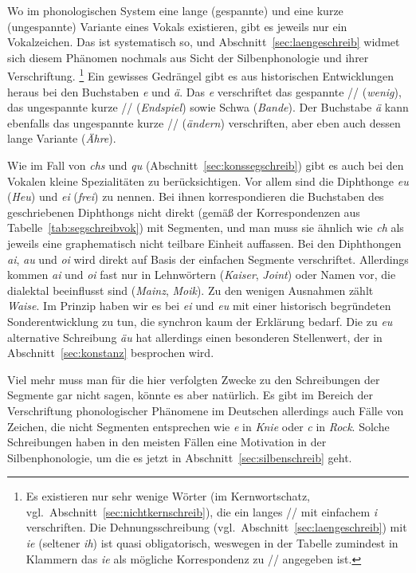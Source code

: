 Wo im phonologischen System eine lange (gespannte) und eine kurze (ungespannte) Variante eines Vokals existieren, gibt es jeweils nur ein Vokalzeichen.
Das ist systematisch so, und Abschnitt~\ref{sec:laengeschreib} widmet sich diesem Phänomen nochmals aus Sicht der Silbenphonologie und ihrer Verschriftung.%
\footnote{Es existieren nur sehr wenige Wörter (im Kernwortschatz, vgl.\ Abschnitt~\ref{sec:nichtkernschreib}), die ein langes // mit einfachem \textit{i} verschriften.
Die Dehnungsschreibung (vgl.\ Abschnitt~\ref{sec:laengeschreib}) mit \textit{ie} (seltener \textit{ih}) ist quasi obligatorisch, weswegen in der Tabelle zumindest in Klammern das \textit{ie} als mögliche Korrespondenz zu // angegeben ist.}
Ein gewisses Gedrängel gibt es aus historischen Entwicklungen heraus bei den Buchstaben \textit{e} und \textit{ä}.
Das \textit{e} verschriftet das gespannte // (\textit{wenig}), das ungespannte kurze // (\textit{Endspiel}) sowie Schwa (\textit{Bande}).
Der Buchstabe \textit{ä} kann ebenfalls das ungespannte kurze // (\textit{ändern}) verschriften, aber eben auch dessen lange Variante (\textit{Ähre}).

Wie im Fall von \textit{chs} und \textit{qu} (Abschnitt~\ref{sec:konssegschreib}) gibt es auch bei den Vokalen kleine Spezialitäten zu berücksichtigen.
Vor allem sind die Diphthonge \textit{eu} (\textit{Heu}) und \textit{ei} (\textit{frei}) zu nennen.
Bei ihnen korrespondieren die Buchstaben des geschriebenen Diphthongs nicht direkt (gemäß der Korrespondenzen aus Tabelle~\ref{tab:segschreibvok}) mit Segmenten, und man muss sie ähnlich wie \textit{ch} als jeweils eine graphematisch nicht teilbare Einheit auffassen.
Bei den Diphthongen \textit{ai}, \textit{au} und \textit{oi} wird direkt auf Basis der einfachen Segmente verschriftet.
Allerdings kommen \textit{ai} und \textit{oi} fast nur in Lehnwörtern (\textit{Kaiser}, \textit{Joint}) oder Namen vor, die dialektal beeinflusst sind (\textit{Mainz}, \textit{Moik}).
Zu den wenigen Ausnahmen zählt \textit{Waise}.
Im Prinzip haben wir es bei \textit{ei} und \textit{eu} mit einer historisch begründeten Sonderentwicklung zu tun, die synchron kaum der Erklärung bedarf.
Die zu \textit{eu} alternative Schreibung \textit{äu} hat allerdings einen besonderen Stellenwert, der in Abschnitt~\ref{sec:konstanz} besprochen wird.

Viel mehr muss man für die hier verfolgten Zwecke zu den Schreibungen der Segmente gar nicht sagen, könnte es aber natürlich.
Es gibt im Bereich der Verschriftung phonologischer Phänomene im Deutschen allerdings auch Fälle von Zeichen, die nicht Segmenten entsprechen wie \textit{e} in \textit{Knie} oder \textit{c} in \textit{Rock}.
Solche Schreibungen haben in den meisten Fällen eine Motivation in der Silbenphonologie, um die es jetzt in Abschnitt~\ref{sec:silbenschreib} geht.

